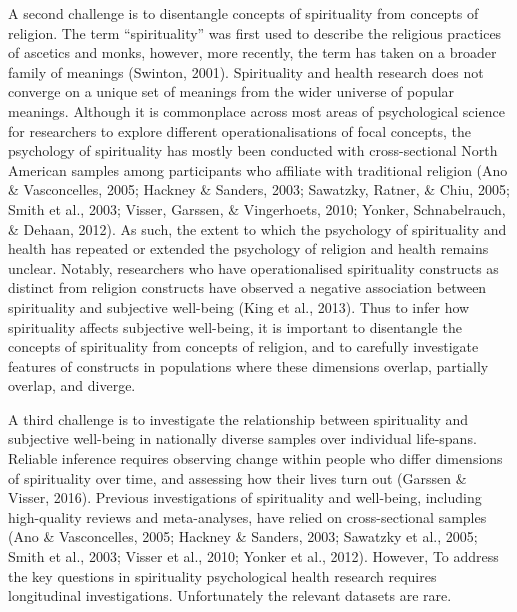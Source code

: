 \documentclass[
  english,
  man,floatsintext]{apa6}
\begin{document}
A second challenge is to disentangle concepts of spirituality from concepts of religion. The term \enquote{spirituality} was first used to describe the religious practices of ascetics and monks, however, more recently, the term has taken on a broader family of meanings (Swinton, 2001). Spirituality and health research does not converge on a unique set of meanings from the wider universe of popular meanings. Although it is commonplace across most areas of psychological science for researchers to explore different operationalisations of focal concepts, the psychology of spirituality has mostly been conducted with cross-sectional North American samples among participants who affiliate with traditional religion (Ano \& Vasconcelles, 2005; Hackney \& Sanders, 2003; Sawatzky, Ratner, \& Chiu, 2005; Smith et al., 2003; Visser, Garssen, \& Vingerhoets, 2010; Yonker, Schnabelrauch, \& Dehaan, 2012). As such, the extent to which the psychology of spirituality and health has repeated or extended the psychology of religion and health remains unclear. Notably, researchers who have operationalised spirituality constructs as distinct from religion constructs have observed a negative association between spirituality and subjective well-being (King et al., 2013). Thus to infer how spirituality affects subjective well-being, it is important to disentangle the concepts of spirituality from concepts of religion, and to carefully investigate features of constructs in populations where these dimensions overlap, partially overlap, and diverge.

A third challenge is to investigate the relationship between spirituality and subjective well-being in nationally diverse samples over individual life-spans. Reliable inference requires observing change within people who differ dimensions of spirituality over time, and assessing how their lives turn out (Garssen \& Visser, 2016). Previous investigations of spirituality and well-being, including high-quality reviews and meta-analyses, have relied on cross-sectional samples (Ano \& Vasconcelles, 2005; Hackney \& Sanders, 2003; Sawatzky et al., 2005; Smith et al., 2003; Visser et al., 2010; Yonker et al., 2012). However, To address the key questions in spirituality psychological health research requires longitudinal investigations. Unfortunately the relevant datasets are rare.
\end{document}
